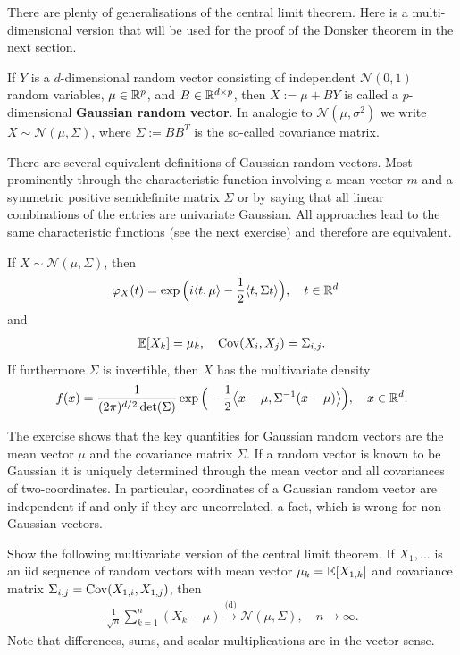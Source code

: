 	There are plenty of generalisations of the central limit theorem. Here is a multi-dimensional version that will be used for the proof of the Donsker theorem in the next section.
	\begin{ldef}
		\begin{deff}
			If $Y$ is a $d$-dimensional random vector consisting of independent $\mathcal N(0,1)$ random variables, $\mu\in \mathbb{R}^p$, and $B\in \mathbb{R}^{d\times p}$, then $X:=\mu+B Y$ is called a $p$-dimensional \textbf{Gaussian random vector}. In analogie to $\mathcal N(\mu,\sigma^2)$ we write $X\sim \mathcal N(\mu,\Sigma)$, where $\Sigma:=B B^T$ is the so-called covariance matrix.
		\end{deff}
	\end{ldef}
There are several equivalent definitions of Gaussian random vectors. Most prominently through the characteristic function involving a mean vector $m$ and a symmetric positive semidefinite matrix $\Sigma$ or by saying that all linear combinations of the entries are univariate Gaussian. All approaches lead to the same characteristic functions (see the next exercise) and therefore are equivalent.
\begin{luebung}
	If $X\sim \mathcal N(\mu, \Sigma)$, then 
	\begin{align}\label{CFG}
		\varphi_X(t)&=\exp\Big(i\langle t,\mu\rangle-\frac 1 2 \langle t,\Sigma t\rangle\Big),\quad t\in\mathbb{R}^d
	\end{align}
	and 
	\begin{align*}
		\mathbb{E}[X_k]=\mu_k,\quad 
		\operatorname{Cov}(X_i,X_j)=\Sigma_{i,j}.
	\end{align*}
	If furthermore $\Sigma$ is invertible, then $X$ has the multivariate density 
	\begin{align*}
		f(x)=\frac{1}{(2\pi)^{d/2} \det(\Sigma)} \exp\Big(-\frac{1}{2} \big\langle x-\mu,\Sigma^{-1}(x-\mu) \big\rangle\Big),\quad x\in\mathbb{R}^d.
	\end{align*}
\end{luebung}
The exercise shows that the key quantities for Gaussian random vectors are the mean vector $\mu$ and the covariance matrix $\Sigma$. If a random vector is known to be Gaussian it is uniquely determined through the mean vector and all covariances of two-coordinates. In particular, coordinates of a Gaussian random vector are independent if and only if they are uncorrelated, a fact, which is wrong for non-Gaussian vectors.
\begin{luebung}
	Show the following multivariate version of the central limit theorem. If $X_1,...$ is an iid sequence of random vectors with mean vector $\mu_k=\mathbb{E}[X_{1,k}]$ and covariance matrix $\Sigma_{i,j}=\operatorname{Cov}(X_{1,i},X_{1,j})$, then
	\begin{align*}
		\frac{1}{\sqrt{n}}\sum_{k=1}^n (X_k-\mu)\overset{\text{(d)}}{\longrightarrow} \mathcal N(\mu,\Sigma),\quad n\to\infty.
	\end{align*}
	Note that differences, sums, and scalar multiplications are in the vector sense.
\end{luebung}

